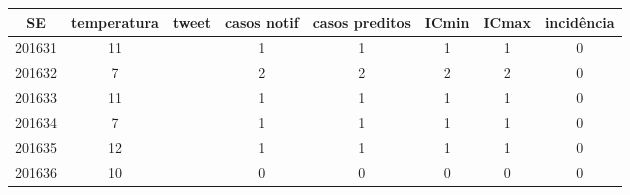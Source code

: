 \begin{tabular}{c|ccccccc}
  \hline
SE & temperatura & tweet & casos notif & casos preditos & ICmin & ICmax & incidência \\ 
  \hline
201631 & 11 &  & 1 & 1 & 1 & 1 & 0 \\ 
  201632 & 7 &  & 2 & 2 & 2 & 2 & 0 \\ 
  201633 & 11 &  & 1 & 1 & 1 & 1 & 0 \\ 
  201634 & 7 &  & 1 & 1 & 1 & 1 & 0 \\ 
  201635 & 12 &  & 1 & 1 & 1 & 1 & 0 \\ 
  201636 & 10 &  & 0 & 0 & 0 & 0 & 0 \\ 
   \hline
\end{tabular}
